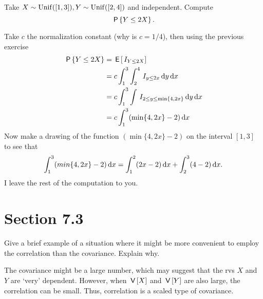 \begin{exercise}\label{ex:2a}
Take $X\sim\mathrm{Unif}([1,3]), Y\sim\mathrm{Unif}([2,4])$ and independent. Compute
\begin{equation}
  \label{eq:824}
\P{Y\leq 2X}.
\end{equation}
\begin{solution}
Take $c$ the normalization constant (why is $c=1/4$), then using the previous exercise
\begin{align}
\,\mathsf{P}\left\{Y\leq 2X\right\}
&=\,\mathsf{E}\left[\,I_{Y\leq 2X}\right] \\
&=c \int_{1}^{3}\int_{2}^{4} \,I_{y\leq 2x} \,\textrm{d}y \,\textrm{d}x \\
&=c \int_{1}^{3}\int \,I_{2\leq y\leq \min\{4,2x\}}  \,\textrm{d}y \,\textrm{d}x \\
&=c \int_{1}^{3} (\min\{4, 2x\} -2) \,\textrm{d}x
\end{align}
Now make a drawing of the function $(\min\{4, 2x\} - 2)$ on the interval $[1,3]$ to see that
\begin{equation}
\int_{1}^{3} (min\{4, 2x\} -2) \,\textrm{d}x = \int_{1}^{2} (2x -2) \,\textrm{d}x + \int_{2}^{3} (4 -2) \,\textrm{d}x.
\end{equation}
I leave the rest of the computation to you.
\end{solution}
\end{exercise}



\section{Section 7.3}
\label{sec:section-7.3}



\begin{exercise}
Give a brief example of a situation where it might be more convenient to employ the correlation than the covariance.  Explain why.
\begin{solution}
The covariance might be a large number, which may  suggest that the rvs $X$ and $Y$ are `very' dependent. However, when $\,\mathsf{V}\left[X\right]$ and $\,\mathsf{V}\left[Y\right]$ are also large, the correlation can be small. Thus, correlation is a scaled type of covariance.
\end{solution}
\end{exercise}

